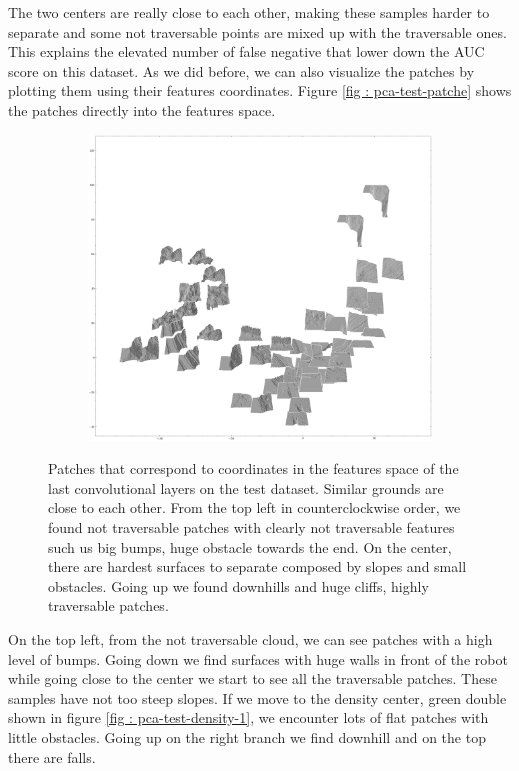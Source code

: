 \documentclass[../document.tex]{subfiles}
\begin{document}
The two centers are really close to each other, making these samples harder to separate and some not traversable points are mixed up with the traversable ones. This explains the elevated number of false negative that lower down the AUC score on this dataset. As we did before, we can also visualize the patches by plotting them using their features coordinates. Figure \ref{fig : pca-test-patche} shows the patches directly into the features space.
\begin{figure} [htbp]
    \centering
    \begin{subfigure}[b]{1\textwidth}
        \includegraphics[width=\linewidth]{../img/5/pca/pca-test-patches-50-None.png}
    \end{subfigure}
\caption{Patches that correspond to coordinates in the features space of the last convolutional layers on the test dataset. Similar grounds are close to each other. From the top left in counterclockwise order, we found not traversable patches with clearly not traversable features such us big bumps, huge obstacle towards the end. On the center, there are hardest surfaces to separate composed by slopes and small obstacles. Going up we found downhills and huge cliffs, highly traversable patches.}
\label{fig : pca-test-patches}
\end{figure}
On the top left, from the not traversable cloud, we can see patches with a high level of bumps. Going down we find surfaces with huge walls in front of the robot while going close to the center we start to see all the traversable patches. These samples have not too steep slopes. If we move to the density center, green double shown in figure \ref{fig : pca-test-density-1}, we encounter lots of flat patches with little obstacles. Going up on the right branch we find downhill and on the top there are falls. 
\end{document}
